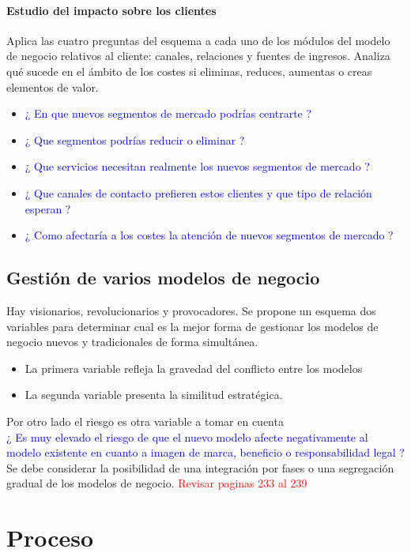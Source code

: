 \documentclass[11pt]{book}
\begin{document}
\subsection{Estudio del impacto sobre los clientes}
Aplica las cuatro preguntas del esquema a cada
uno de los módulos del modelo de negocio relativos al
cliente: canales, relaciones y fuentes de ingresos. Analiza
qué sucede en el ámbito de los costes si eliminas,
reduces, aumentas o creas elementos de valor.
\begin{itemize}
\item\textcolor{blue}{¿ En que nuevos segmentos de mercado podrías centrarte ?}
\item\textcolor{blue}{¿ Que segmentos podrías reducir o eliminar ?}
\item\textcolor{blue}{¿ Que servicios necesitan realmente los nuevos segmentos de mercado ?}
\item\textcolor{blue}{¿ Que canales de contacto prefieren estos clientes y que tipo de relación esperan ?}
\item\textcolor{blue}{¿ Como afectaría a los costes la atención de nuevos segmentos de mercado ?}
\end{itemize}
\chapter{Gestión de varios modelos de negocio}
Hay visionarios, revolucionarios y provocadores.
Se propone un esquema dos variables para determinar cual es la mejor forma de gestionar los modelos de negocio nuevos y tradicionales de forma simultánea. 
\begin{itemize}
\item La primera variable refleja la gravedad del conflicto entre los modelos
\item La segunda variable presenta la similitud estratégica.
\end{itemize}
Por otro lado el riesgo es otra variable a tomar en cuenta \\
\textcolor{blue}{¿ Es muy elevado el riesgo de que el nuevo modelo afecte negativamente al modelo existente en cuanto a imagen de marca, beneficio o responsabilidad legal ?}
Se debe considerar la posibilidad de una integración por fases o una segregación gradual de los modelos de negocio.
\textcolor{red}{Revisar paginas 233 al 239}
\part{Proceso}
\end{document}
